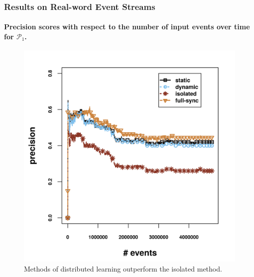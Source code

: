 \begin{frame}
	
	\frametitle{Results on Real-word Event Streams }
	\framesubtitle{Precision scores with respect to the number of input events over time for $\mathcal{P}_1$.}
	
	\begin{figure}[H]
		\centering
		\includegraphics[width=.7\textwidth,height=.65\textheight]{../chapters/figures/synopses/new/precision_p1.png}\linebreak\\
	Methods of distributed learning outperform the isolated method.
		
	\end{figure}
	
\end{frame}




